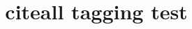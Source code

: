 \documentclass{article}
\title{citeall tagging test}
\begin{document}
\cite{angenendt}

\citeall[\textcite][5]

\printbibliography
\end{document}
